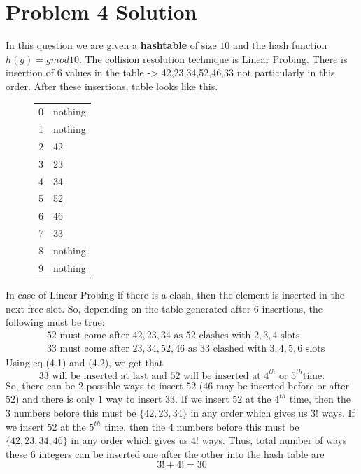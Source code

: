 \documentclass{article}
\let\bold\textbf
\begin{document}
\section{Problem 4 Solution}{
  In this question we are given a \bold{hashtable} of size $10$ and the hash function $h(g) = g mod 10$. The collision resolution technique is Linear Probing. \newline
  There is insertion of $6$ values in the table -> 42,23,34,52,46,33 not particularly in this order. After these insertions, table looks like this. \newline
  \begin{figure}[h]
    \centering
  \begin{tabular}{l | l} 
    0 & nothing \\
    1 & nothing \\
    2 & 42 \\
    3 & 23 \\
    4 & 34 \\
    5 & 52 \\
    6 & 46 \\
    7 & 33 \\
    8 & nothing \\
    9 & nothing
  \end{tabular}
  \end{figure}
  \newline In case of Linear Probing if there is a clash, then the element is inserted in the next free slot. \newline
  So, depending on the table generated after 6 insertions, the following must be true:
  \begin{align}
    &52 \text{ must come after } 42,23,34 \text{ as } 52 \text{ clashes with } 2,3,4 \text{ slots} \label{eq:1} \\
    &33 \text{ must come after } 23,34,52,46 \text{ as } 33 \text{ clashed with } 3,4,5,6 \text{ slots}
  \end{align}
  Using eq (4.1) and (4.2), we get that $$33 \text{ will be inserted at last and } 52 \text{ will be inserted at } 4^{th} \text{ or } 5^{th} \text{time.}$$
  So, there can be $2$ possible ways to insert $52$ ($46$ may be inserted before or after $52$) and there is only $1$ way to insert $33$.\newline
  If we insert $52$ at the $4^{th}$ time, then the $3$ numbers before this must be $\{42,23,34\}$ in any order which gives us $3!$ ways. \newline
  If we insert $52$ at the $5^{th}$ time, then the $4$ numbers before this must be $\{42,23,34,46\}$ in any order which gives us $4!$ ways. \newline
  Thus, total number of ways these $6$ integers can be inserted one after the other into the hash table are $$ 3!+4! = 30$$
}
\newpage
\end{document}
